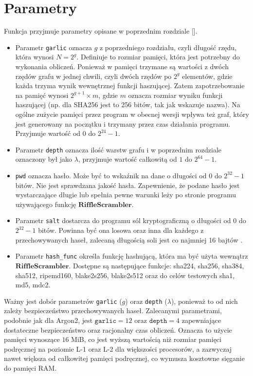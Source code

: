 \section{Parametry}
Funkcja przyjmuje parametry opisane w poprzednim rozdziale [].
\begin{itemize}
	\item Parametr \texttt{garlic} oznacza $g$ z poprzedniego rozdziału, czyli długość rzędu, która wynosi $N = 2^{g}$.
	Definiuje to rozmiar pamięci, która jest potrzebny do wykonania obliczeń.
	Ponieważ w pamięci trzymane są wartości z dwóch rzędów grafu w jednej chwili, czyli dwóch rzędów po $2^g$ elementów, gdzie każda trzyma wynik wewnętrznej funkcji haszującej. Zatem zapotrzebowanie na pamięć wynosi $2^{g + 1} \times m$, gdzie $m$ oznacza rozmiar wyniku funkcji haszującej (np. dla SHA256 jest to 256 bitów, tak jak wskazuje nazwa).
	Na ogólne zużycie pamięci przez program w obecnej wersji wpływa też graf, który jest generowany na początku i trzymany przez czas działania programu. Przyjmuje wartość od $0$ do $2^{24} - 1$.
	
	\item Parametr \texttt{depth} oznacza ilość warstw grafu i w poprzednim rozdziale oznaczony był jako $\lambda$, przyjmuje wartość całkowitą od $1$ do $2^{64} - 1$.
	
	\item \texttt{pwd} oznacza hasło. Może być to wskaźnik na dane o długości od $0$ do $2^{32} -1$ bitów. Nie jest sprawdzana jakość hasła.
	Zapewnienie, że podane hasło jest wystarczające długie lub spełnia pewne warunki leży po stronie programu używającego funkcję $\mathbf{RiffleScrambler}$.
	\item Parametr \texttt{salt} dostarcza do programu sól kryptograficzną o długości od $0$ do $2^{32} - 1$ bitów. Powinna być ona losowa oraz inna dla każdego z przechowywanych haseł, zalecaną długością soli jest co najmniej 16 bajtów \cite{PHC2013}.
	
	\item Parametr \texttt{hash\_func} określa funkcję hashującą, która ma być użyta wewnątrz $\mathbf{RiffleScrambler}$. Dostępne są następujące funkcje: sha224, sha256, sha384, sha512, ripemd160, blake2s256, blake2s512 oraz do celów testowych sha1, md5, mdc2.
\end{itemize}

Ważny jest dobór parametrów \texttt{garlic} ($g$) oraz \texttt{depth} ($\lambda$), ponieważ to od nich zależy bezpieczeństwo przechowywanych haseł. Zalecanymi parametrami, podobnie jak dla Argon2, jest $\texttt{garlic}=12$ oraz $\texttt{depth}=4$ zapewniające dostateczne bezpieczeństwo oraz racjonalny czas obliczeń. Oznacza to użycie pamięci wynoszące $16$ MiB, co jest wyższą wartością niż rozmiar pamięci podręcznej na poziomie L-1 oraz L-2 dla większości procesorów, a zazwyczaj nawet większa od całkowitej pamięci podręcznej, co wymusza kosztowne sięganie do pamięci RAM. 

